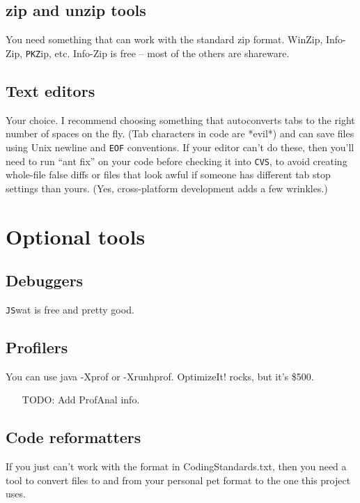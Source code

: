 \documentclass{article}
\begin{document}
\subsection{zip and unzip tools}

You need something that can work with the standard zip format.  WinZip, 
Info-Zip, \texttt{PKZ}ip, etc.  Info-Zip is free -- most of the others are shareware.  

\subsection{Text editors}

Your choice.  I recommend choosing something that autoconverts tabs to
the right number of spaces on the fly.  (Tab characters in code are *evil*)
and can save files using Unix newline and \texttt{EOF} conventions.  If your editor 
can't do these, then you'll need to run ``ant fix'' on your code before 
checking it into \texttt{CVS}, to avoid creating whole-file false diffs or files
that look awful if someone has different tab stop settings than yours.
(Yes, cross-platform development adds a few wrinkles.)


\section{Optional tools}

\subsection{Debuggers}

\texttt{JS}wat is free and pretty good.

\subsection{Profilers}

You can use java -Xprof or -Xrunhprof.
OptimizeIt! rocks, but it's \$500.
\begin{itemize}
\item[TODO:]  Add ProfAnal info.
\end{itemize}

\subsection{Code reformatters}

If you just can't work with the format in CodingStandards.txt, then you
need a tool to convert files to and from your personal pet format to the
one this project uses.
\end{document}
